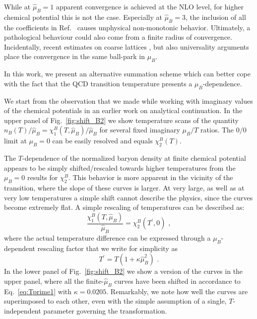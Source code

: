 \documentclass[aps,prd,twocolumn,superscriptaddress]{revtex4-2}
\newcommand \hmu {\hat{\mu}}
\begin{document}
While at $\hmu_B=1$ apparent convergence is achieved at the NLO level, for
higher chemical potential this is not the case.  Especially at $\hmu_B=3$, the
inclusion of all the coefficients in Ref.~\cite{Borsanyi:2018grb} causes
unphysical non-monotonic behavior. Ultimately, a pathological behaviour
could also come from a finite radius of convergence. Incidentally,
recent estimates on coarse lattices \cite{Giordano:2019slo,Giordano:2019gev},
but also universality arguments \cite{Connelly:2020pno} place the 
convergence in the same ball-park in $\mu_B$.

In this work, we present an alternative summation 
scheme which can better cope with the fact that the 
QCD transition temperature presents a $\mu_B$-dependence. 

We start from the observation that we made while working
with imaginary values of the chemical potentials in an earlier
work on analytical continuation. In the upper panel of Fig.~\ref{fig:shift_B2} 
we show temperature scans of the quantity 
$n_B(T)/\hmu_B = \chi^B_1(T,\hmu_B)/\hmu_B$ for several fixed imaginary 
$\mu_B/T$ ratios. The $0/0$ limit at $\mu_B=0$ can be easily resolved and 
equals $\chi_2^B(T)$.

The $T$-dependence of the normalized baryon density at 
finite chemical potential appears to be simply shifted/rescaled
towards higher temperatures from the $\mu_B=0$ 
results for $\chi_2^B$. This behavior is more apparent 
in the vicinity of the transition, where the slope of 
these curves is larger. At very large, as well as at very 
low temperatures a simple shift cannot describe the 
physics, since the curves become extremely flat. 
A simple rescaling of temperatures can be described as:
\begin{equation} \label{eq:shift1}
\frac{\chi_1^B(T,\hmu_B)}{\hmu_B} = \chi_2^B (T^\prime,0) \, \,  , 
\end{equation}
where the actual temperature difference can be expressed through a 
$\mu_B$-dependent rescaling factor that we write for simplicity as
\begin{equation} \label{eq:Tprime1}
T^\prime = T \left( 1 + \kappa \hmu_B^2 \right) \, \, .
\end{equation}
In the lower panel of Fig.~\ref{fig:shift_B2} we show a version of the 
curves in the upper panel, where all the finite-$\hat{\mu}_B$ curves
have been shifted in accordance to Eq.~\eqref{eq:Tprime1} with
$\kappa=0.0205$. Remarkably, we note how well the curves are 
superimposed to each other, even with the simple assumption of 
a single, $T$-independent parameter governing the transformation.
\end{document}
